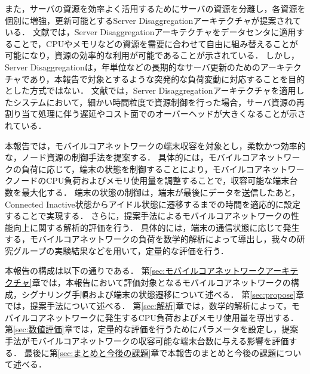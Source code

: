 \documentclass[technicalreport]{ieicej-rev}
\begin{document}
また，サーバの資源を効率よく活用するためにサーバの資源を分離し，各資源を個別に増強，更新可能とするServer Disaggregationアーキテクチャが提案されている\cite{TechnoEconomicFrameworkforCloudInfrastructureACostStudyofResourceDisaggregation,IntelsDisaggregatedServerRack,EnhancedBackoffTimerSolutionforGTPCOverloadControl,DisaggregatedandOpticallyInterconnectedMemoryWhenwillitbecosteffective,DisaggregatedServersDriveDataCenterEfficiencyandInnovation,UnderstandingRackScaleDisaggregatedStorage}．
文献\cite{TechnoEconomicFrameworkforCloudInfrastructureACostStudyofResourceDisaggregation}では，Server Disaggregationアーキテクチャをデータセンタに適用することで，CPUやメモリなどの資源を需要に合わせて自由に組み替えることが可能になり，資源の効率的な利用が可能であることが示されている．
しかし，Server Disaggregationは，年単位などの長期的なサーバ更新のためのアーキテクチャであり，本報告で対象とするような突発的な負荷変動に対応することを目的とした方式ではない．
文献\cite{UnderstandingRackScaleDisaggregatedStorage}では，Server Disaggregationアーキテクチャを適用したシステムにおいて，細かい時間粒度で資源制御を行った場合，サーバ資源の再割り当て処理に伴う遅延やコスト面でのオーバーヘッドが大きくなることが示されている．

本報告では，モバイルコアネットワークの端末収容を対象とし，柔軟かつ効率的な，ノード資源の制御手法を提案する．
具体的には，モバイルコアネットワークの負荷に応じて，端末の状態を制御することにより，モバイルコアネットワークノードのCPU負荷およびメモリ使用量を調整することで，収容可能な端末台数を最大化する．
端末の状態の制御は，端末が最後にデータを送信したあと，Connected Inactive状態からアイドル状態に遷移するまでの時間を適応的に設定することで実現する．
さらに，提案手法によるモバイルコアネットワークの性能向上に関する解析的評価を行う．
具体的には，端末の通信状態に応じて発生する，モバイルコアネットワークの負荷を数学的解析によって導出し，我々の研究グループの実験結果などを用いて，定量的な評価を行う．

本報告の構成は以下の通りである．
第\ref{sec:モバイルコアネットワークアーキテクチャ}章では，本報告において評価対象となるモバイルコアネットワークの構成，シグナリング手順および端末の状態遷移について述べる．
第\ref{sec:propose}章では，提案手法について述べる．
第\ref{sec:解析}章では，数学的解析によって，モバイルコアネットワークに発生するCPU負荷およびメモリ使用量を導出する．
第\ref{sec:数値評価}章では，定量的な評価を行うためにパラメータを設定し，提案手法がモバイルコアネットワークの収容可能な端末台数に与える影響を評価する．
最後に第\ref{sec:まとめと今後の課題}章で本報告のまとめと今後の課題について述べる．
\end{document}
